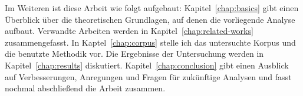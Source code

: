 Im Weiteren ist diese Arbeit wie folgt aufgebaut:
Kapitel~\ref{chap:basics} gibt einen Überblick über die theoretischen Grundlagen, auf denen die vorliegende Analyse aufbaut.
Verwandte Arbeiten werden in Kapitel~\ref{chap:related-works} zusammengefasst.
In Kaptel~\ref{chap:corpus} stelle ich das untersuchte Korpus und die benutzte Methodik vor.
Die Ergebnisse der Untersuchung werden in Kapitel~\ref{chap:results} diskutiert.
Kapitel~\ref{chap:conclusion} gibt einen Ausblick auf Verbesserungen, Anregungen und Fragen für zukünftige Analysen und fasst nochmal abschließend die Arbeit zusammen.


\begin{comment}
* media: promotes wide spread/conservative varieties

* influence of the media: ``they do contribute to popular acceptance and use of some new vocabulary'' [Zentella90]
(siehe oben bei Spanglish)
-> Spielen auch für leveling eine Rolle: versuchen neutrale Varianten zu nutzen, um möglichst mehr Menschen zu erreichen;



A final common assumption is that the media leads language changes. In fact, it belatedly reflects the changes.

The same fallacy seems to underlie the casual assumption that the mass media drives all kinds of language changes.

If the mass media can popularize words and expressions, then “presumably” it can also spread other kinds of linguistic changes. We generalize from one limited effect to a host of others.

Media
-----
This is especially true regarding language, because, as Trudgill notes, «the media... have almost no effect at all in
phonological or grammatical change» (1984:61), although they do contribute to popular acceptance and
use of some new vocabulary. [Zentella90]

Marshall McLuhan: hot and cold media
hot media: ``Hot media do not leave so much to be filled in by audience.
Hot media are, therefore, low in participation or completion by audience.'' [Willie79]


\end{comment}
